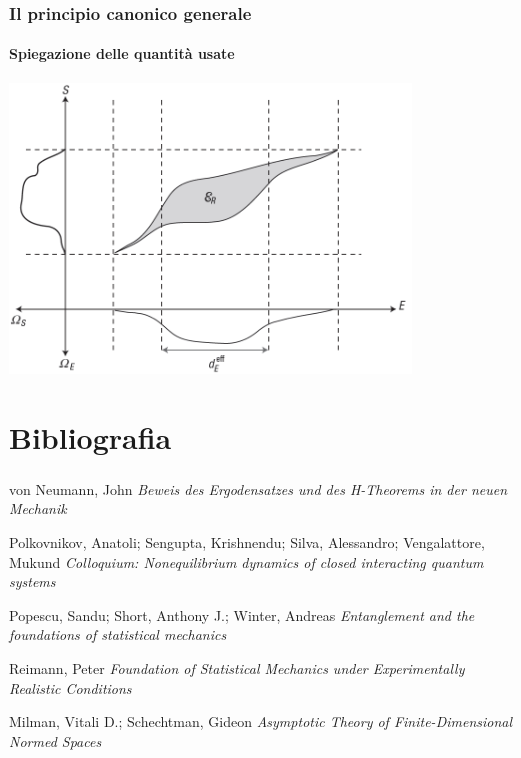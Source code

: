 \documentclass{beamer}
\theoremstyle{definition}
\theoremstyle{plain}
\begin{document}
\begin{frame}
	\frametitle{Il principio canonico generale}
	\framesubtitle{Spiegazione delle quantità usate}
	
	\centering
	\includegraphics[width=0.8\textwidth]{./Images/popescu(deff).png}
\end{frame}

\section{Bibliografia}
\begin{frame}[allowframebreaks]
	\transpush[direction = 180]
	\frametitle{\refname}
	\hypertarget{bib}{}
		
	\begin{thebibliography}{9}
		von Neumann, John
		\newblock \emph{Beweis des Ergodensatzes und des H-Theorems in der neuen Mechanik}
		
		Polkovnikov, Anatoli; Sengupta, Krishnendu; Silva, Alessandro; Vengalattore, Mukund
		\newblock \emph{Colloquium: Nonequilibrium dynamics of closed interacting quantum systems}
		
		Popescu, Sandu; Short, Anthony J.; Winter, Andreas
		\newblock \emph{Entanglement and the foundations of statistical mechanics}
		
		Reimann, Peter
		\newblock \emph{Foundation of Statistical Mechanics under Experimentally Realistic Conditions}
		
		Milman, Vitali D.; Schechtman, Gideon
		\newblock \emph{Asymptotic Theory of Finite-Dimensional Normed Spaces}
	\end{thebibliography}
\end{frame}
\end{document}
